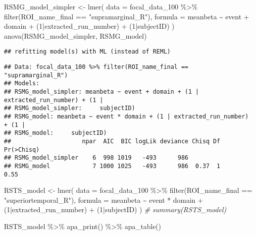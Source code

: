 \documentclass[
]{article}
\newenvironment{Shaded}{\begin{snugshade}}{\end{snugshade}}
\newcommand{\AttributeTok}[1]{\textcolor[rgb]{0.77,0.63,0.00}{#1}}
\newcommand{\CommentTok}[1]{\textcolor[rgb]{0.56,0.35,0.01}{\textit{#1}}}
\newcommand{\DecValTok}[1]{\textcolor[rgb]{0.00,0.00,0.81}{#1}}
\newcommand{\FunctionTok}[1]{\textcolor[rgb]{0.00,0.00,0.00}{#1}}
\newcommand{\NormalTok}[1]{#1}
\newcommand{\OtherTok}[1]{\textcolor[rgb]{0.56,0.35,0.01}{#1}}
\newcommand{\SpecialCharTok}[1]{\textcolor[rgb]{0.00,0.00,0.00}{#1}}
\newcommand{\StringTok}[1]{\textcolor[rgb]{0.31,0.60,0.02}{#1}}
\begin{document}
\begin{Shaded}
\begin{Highlighting}[]
\NormalTok{RSMG\_model\_simpler }\OtherTok{\textless{}{-}} \FunctionTok{lmer}\NormalTok{(}
      \AttributeTok{data =}\NormalTok{ focal\_data\_100 }\SpecialCharTok{\%\textgreater{}\%} \FunctionTok{filter}\NormalTok{(ROI\_name\_final }\SpecialCharTok{==} \StringTok{"supramarginal\_R"}\NormalTok{),}
      \AttributeTok{formula =}\NormalTok{ meanbeta }\SpecialCharTok{\textasciitilde{}}\NormalTok{ event }\SpecialCharTok{+}\NormalTok{ domain }\SpecialCharTok{+}\NormalTok{ (}\DecValTok{1}\SpecialCharTok{|}\NormalTok{extracted\_run\_number) }\SpecialCharTok{+}\NormalTok{ (}\DecValTok{1}\SpecialCharTok{|}\NormalTok{subjectID)}
\NormalTok{    )}
\FunctionTok{anova}\NormalTok{(RSMG\_model\_simpler, RSMG\_model)}
\end{Highlighting}
\end{Shaded}

\begin{verbatim}
## refitting model(s) with ML (instead of REML)
\end{verbatim}

\begin{verbatim}
## Data: focal_data_100 %>% filter(ROI_name_final == "supramarginal_R")
## Models:
## RSMG_model_simpler: meanbeta ~ event + domain + (1 | extracted_run_number) + (1 | 
## RSMG_model_simpler:     subjectID)
## RSMG_model: meanbeta ~ event * domain + (1 | extracted_run_number) + (1 | 
## RSMG_model:     subjectID)
##                    npar  AIC  BIC logLik deviance Chisq Df Pr(>Chisq)
## RSMG_model_simpler    6  998 1019   -493      986                    
## RSMG_model            7 1000 1025   -493      986  0.37  1       0.55
\end{verbatim}

\begin{Shaded}
\begin{Highlighting}[]
\NormalTok{RSTS\_model }\OtherTok{\textless{}{-}} \FunctionTok{lmer}\NormalTok{(}
      \AttributeTok{data =}\NormalTok{ focal\_data\_100 }\SpecialCharTok{\%\textgreater{}\%} \FunctionTok{filter}\NormalTok{(ROI\_name\_final }\SpecialCharTok{==} \StringTok{"superiortemporal\_R"}\NormalTok{),}
      \AttributeTok{formula =}\NormalTok{ meanbeta }\SpecialCharTok{\textasciitilde{}}\NormalTok{ event }\SpecialCharTok{*}\NormalTok{ domain }\SpecialCharTok{+}\NormalTok{ (}\DecValTok{1}\SpecialCharTok{|}\NormalTok{extracted\_run\_number) }\SpecialCharTok{+}\NormalTok{ (}\DecValTok{1}\SpecialCharTok{|}\NormalTok{subjectID)}
\NormalTok{    )}
\CommentTok{\# summary(RSTS\_model)}

\NormalTok{RSTS\_model }\SpecialCharTok{\%\textgreater{}\%}
  \FunctionTok{apa\_print}\NormalTok{() }\SpecialCharTok{\%\textgreater{}\%}
  \FunctionTok{apa\_table}\NormalTok{()}
\end{Highlighting}
\end{Shaded}
\end{document}
